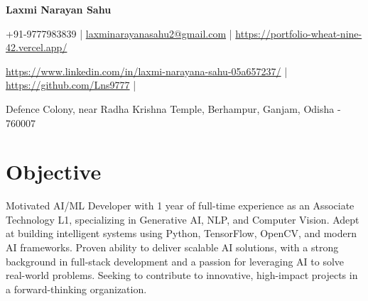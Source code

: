 \documentclass[a4paper,11pt]{article}
\newcommand{\socialicon}[1]{\raisebox{-0.05em}{\resizebox{!}{1em}{#1}}}
\newcommand{\ieeeicon}[1]{\raisebox{-0.3em}{\resizebox{!}{1.3em}{#1}}}
\newcommand{\headerfontiii}{\fontfamily{ppl}\selectfont} %
\begin{document}
\headerfontiii

\begin{center}
    {\Huge\textbf{Laxmi Narayan Sahu}}
\end{center}
\vspace{-6mm}

\begin{center}
    \small{
    +91-9777983839 | \href{mailto:youremail@example.com}{laxminarayanasahu2@gmail.com} | 
    \href{https://www.yourwebsite.com/}{https://portfolio-wheat-nine-42.vercel.app/}
    }
\end{center}
\vspace{-6mm}

\begin{center}
    \small{
    \socialicon{\faLinkedin} \href{https://www.linkedin.com/in/your-profile/}{https://www.linkedin.com/in/laxmi-narayana-sahu-05a657237/} | 
    \socialicon{\faGithub} \href{https://github.com/your-username}{https://github.com/Lns9777} | 
    }
\end{center}
\vspace{-6mm}
\begin{center}
    \small{Defence Colony, near Radha Krishna Temple, Berhampur, Ganjam, Odisha - 760007}
\end{center}

\vspace{-4mm}

\section{\textbf{Objective}}
\vspace{1mm}
\small{
Motivated AI/ML Developer with 1 year of full-time experience as an Associate Technology L1, specializing in Generative AI, NLP, and Computer Vision. Adept at building intelligent systems using Python, TensorFlow, OpenCV, and modern AI frameworks. Proven ability to deliver scalable AI solutions, with a strong background in full-stack development and a passion for leveraging AI to solve real-world problems. Seeking to contribute to innovative, high-impact projects in a forward-thinking organization.
}
\vspace{-2mm}
\end{document}
